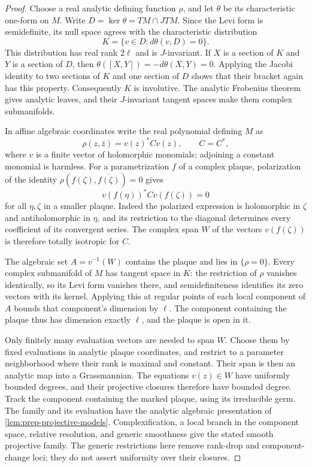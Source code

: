 \begin{proof}
Choose a real analytic defining function $\rho$, and let $\theta$ be its characteristic one-form on $M$.  Write $D=\ker\theta=TM\cap JTM$. Since the Levi form is semidefinite, its null space agrees with the characteristic distribution
\[
 K=\{v\in D:d\theta(v,D)=0\}.
\]
This distribution has real rank $2\ell$ and is $J$-invariant.  If $X$ is a section of $K$ and $Y$ is a section of $D$, then $\theta([X,Y])=-d\theta(X,Y)=0$.  Applying the Jacobi identity to two sections of $K$ and one section of $D$ shows that their bracket again has this property.  Consequently $K$ is involutive.  The analytic Frobenius theorem gives analytic leaves, and their $J$-invariant tangent spaces make them complex submanifolds.

In affine algebraic coordinates write the real polynomial defining $M$ as
\[
             \rho(z,\bar z)=v(z)^*C v(z),\qquad C=C^*,
\]
where $v$ is a finite vector of holomorphic monomials; adjoining a constant monomial is harmless.  For a parametrization $f$ of a complex plaque, polarization of the identity $\rho(f(\zeta),\overline{f(\zeta)})=0$ gives
\[
             v(f(\eta))^*C v(f(\zeta))=0
\]
for all $\eta,\zeta$ in a smaller plaque.  Indeed the polarized expression is holomorphic in $\zeta$ and antiholomorphic in $\eta$, and its restriction to the diagonal determines every coefficient of its convergent series. The complex span $W$ of the vectors $v(f(\zeta))$ is therefore totally isotropic for $C$.

The algebraic set $A=v^{-1}(W)$ contains the plaque and lies in $\{\rho=0\}$.  Every complex submanifold of $M$ has tangent space in $K$: the restriction of $\rho$ vanishes identically, so its Levi form vanishes there, and semidefiniteness identifies its zero vectors with its kernel. Applying this at regular points of each local component of $A$ bounds that component's dimension by $\ell$.  The component containing the plaque thus has dimension exactly $\ell$, and the plaque is open in it.

Only finitely many evaluation vectors are needed to span $W$.  Choose them by fixed evaluations in analytic plaque coordinates, and restrict to a parameter neighborhood where their rank is maximal and constant. Their span is then an analytic map into a Grassmannian.  The equations $v(z)\in W$ have uniformly bounded degrees, and their projective closures therefore have bounded degree.  Track the component containing the marked plaque, using its irreducible germ.  The family and its evaluation have the analytic algebraic presentation of \cref{lem:prep-projective-models}. Complexification, a local branch in the component space, relative resolution, and generic smoothness give the stated smooth projective family.  The generic restrictions here remove rank-drop and component-change loci; they do not assert uniformity over their closures.
\end{proof}

